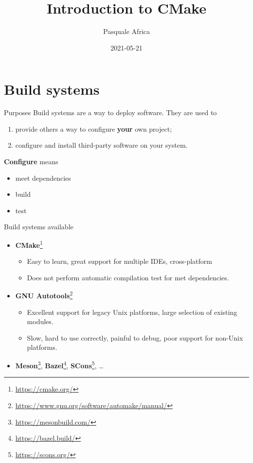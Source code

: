 \documentclass[aspectratio=169,11pt]{beamer}
\title{Introduction to CMake}
\author{Pasquale Africa}
\institute{Politecnico di Milano}
\date{2021-05-21}
\newcommand{\pro}{\textcolor{example}{\ding{51}}}
\newcommand{\con}{\alert{\ding{55}}}
\begin{document}
\begin{frame}[plain]{}
    \maketitle
\end{frame}

\section{Build systems}
\begin{frame}{Purposes}
    Build systems are a way to deploy software.
    \vfill
    They are used to
    \begin{enumerate}
        \item provide others a way to configure \textbf{your} own project;
        \item configure and install third-party software on your system.
    \end{enumerate}
    \vfill
    \textbf{Configure} means
    \begin{itemize}
        \item meet dependencies
        \item build
        \item test
    \end{itemize}
\end{frame}

\begin{frame}{Build systems available}
    \begin{itemize}
    \item \textbf{CMake}\footnote{\url{https://cmake.org/}}
    \begin{itemize}
    \item[\pro] Easy to learn, great support for multiple IDEs, cross-platform
    \item[\con] Does not perform automatic compilation test for met dependencies.
    \end{itemize}
    \item \textbf{GNU Autotools}\footnote{\url{https://www.gnu.org/software/automake/manual/}}
    \begin{itemize}
    \item[\pro] Excellent support for legacy Unix platforms, large selection of existing modules.
    \item[\con] Slow, hard to use correctly, painful to debug, poor support for non-Unix platforms.
    \end{itemize}
    \item \textbf{Meson}\footnote{\url{https://mesonbuild.com/}}, \textbf{Bazel}\footnote{\url{https://bazel.build/}}, \textbf{SCons}\footnote{\url{https://scons.org/}}, \dots
    \end{itemize}
\end{frame}
\end{document}

